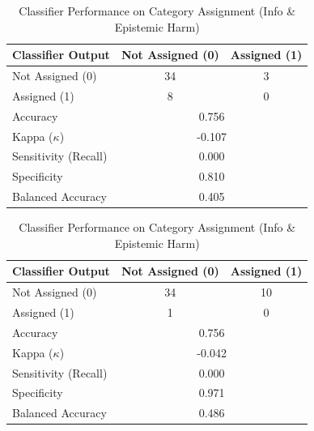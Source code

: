 \begin{table}[h!]
\begin{minipage}{0.48\textwidth}
\centering
\caption{Classifier Performance on Category Assignment (Individual/Group Harm)}
\label{tab:cm-indiv-grp-harm}
\begin{tabular}{lcc}
\hline
\textbf{Classifier Output} & \textbf{Not Assigned (0)} & \textbf{Assigned (1)} \\
\hline
Not Assigned (0) & 34 & 3 \\
Assigned (1) & 8 & 0 \\
\hline
Accuracy & \multicolumn{2}{c}{0.756} \\
Kappa ($\kappa$) & \multicolumn{2}{c}{-0.107} \\
Sensitivity (Recall) & \multicolumn{2}{c}{0.000} \\
Specificity & \multicolumn{2}{c}{0.810} \\
Balanced Accuracy & \multicolumn{2}{c}{0.405} \\
\hline
\end{tabular}
\end{minipage}
\hfill
\hfill
\begin{minipage}{0.48\textwidth}
\centering
\caption{Classifier Performance on Category Assignment (Info \& Epistemic Harm)}
\label{tab:cm-info-epistemic-harm}
\begin{tabular}{lcc}
\hline
\textbf{Classifier Output} & \textbf{Not Assigned (0)} & \textbf{Assigned (1)} \\
\hline
Not Assigned (0) & 34 & 10 \\
Assigned (1) & 1 & 0 \\
\hline
Accuracy & \multicolumn{2}{c}{0.756} \\
Kappa ($\kappa$) & \multicolumn{2}{c}{-0.042} \\
Sensitivity (Recall) & \multicolumn{2}{c}{0.000} \\
Specificity & \multicolumn{2}{c}{0.971} \\
Balanced Accuracy & \multicolumn{2}{c}{0.486} \\
\hline
\end{tabular}
\end{minipage}
\end{table}

